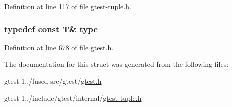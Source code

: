 \-Definition at line 117 of file gtest-\/tuple.\-h.

\hypertarget{structstd_1_1tr1_1_1gtest__internal_1_1ByRef_adc53121e54ca020c126cd642b99b6288}{
\subsubsection[{type}]{\setlength{\rightskip}{0pt plus 5cm}typedef const \-T\& {\bf type}}}\label{d1/d1d/structstd_1_1tr1_1_1gtest__internal_1_1ByRef_adc53121e54ca020c126cd642b99b6288}


\-Definition at line 678 of file gtest.\-h.



\-The documentation for this struct was generated from the following files\-:\begin{DoxyCompactItemize}
\item 
gtest-\/1../fused-\/src/gtest/\hyperlink{fused-src_2gtest_2gtest_8h}{gtest.\-h}\item 
gtest-\/1../include/gtest/internal/\hyperlink{gtest-tuple_8h}{gtest-\/tuple.\-h}\end{DoxyCompactItemize}

